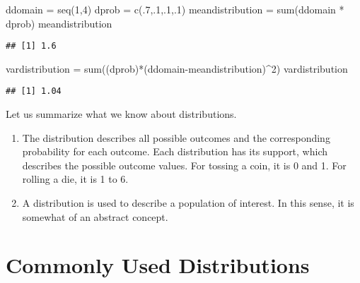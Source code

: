 \documentclass[
]{article}
\newenvironment{Shaded}{\begin{snugshade}}{\end{snugshade}}
\newcommand{\DecValTok}[1]{\textcolor[rgb]{0.00,0.00,0.81}{#1}}
\newcommand{\FunctionTok}[1]{\textcolor[rgb]{0.00,0.00,0.00}{#1}}
\newcommand{\NormalTok}[1]{#1}
\newcommand{\OtherTok}[1]{\textcolor[rgb]{0.56,0.35,0.01}{#1}}
\newcommand{\SpecialCharTok}[1]{\textcolor[rgb]{0.00,0.00,0.00}{#1}}
\providecommand{\tightlist}{%
  \setlength{\itemsep}{0pt}\setlength{\parskip}{0pt}}
\begin{document}
\begin{Shaded}
\begin{Highlighting}[]
\NormalTok{ddomain }\OtherTok{=} \FunctionTok{seq}\NormalTok{(}\DecValTok{1}\NormalTok{,}\DecValTok{4}\NormalTok{)}
\NormalTok{dprob }\OtherTok{=} \FunctionTok{c}\NormalTok{(.}\DecValTok{7}\NormalTok{,.}\DecValTok{1}\NormalTok{,.}\DecValTok{1}\NormalTok{,.}\DecValTok{1}\NormalTok{)}
\NormalTok{meandistribution }\OtherTok{=} \FunctionTok{sum}\NormalTok{(ddomain }\SpecialCharTok{*}\NormalTok{ dprob)}
\NormalTok{meandistribution}
\end{Highlighting}
\end{Shaded}

\begin{verbatim}
## [1] 1.6
\end{verbatim}

\begin{Shaded}
\begin{Highlighting}[]
\NormalTok{vardistribution }\OtherTok{=} \FunctionTok{sum}\NormalTok{((dprob)}\SpecialCharTok{*}\NormalTok{(ddomain}\SpecialCharTok{{-}}\NormalTok{meandistribution)}\SpecialCharTok{\^{}}\DecValTok{2}\NormalTok{)}
\NormalTok{vardistribution}
\end{Highlighting}
\end{Shaded}

\begin{verbatim}
## [1] 1.04
\end{verbatim}

Let us summarize what we know about distributions.

\begin{enumerate}
\def\labelenumi{\arabic{enumi}.}
\tightlist
\item
  The distribution describes all possible outcomes and the corresponding
  probability for each outcome. Each distribution has its support, which
  describes the possible outcome values. For tossing a coin, it is 0 and
  1. For rolling a die, it is 1 to 6.\\
\item
  A distribution is used to describe a population of interest. In this
  sense, it is somewhat of an abstract concept.
\end{enumerate}

\hypertarget{commonly-used-distributions}{%
\section{Commonly Used
Distributions}\label{commonly-used-distributions}}
\end{document}
